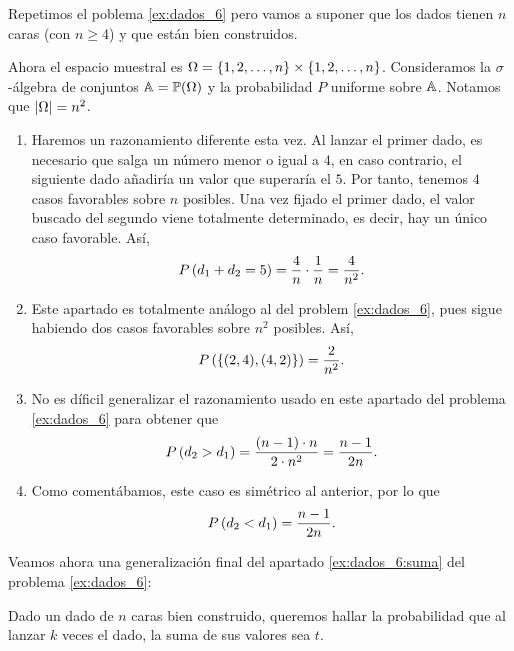 \begin{exercise} \label{ex:dados_n} Repetimos el poblema \ref{ex:dados_6}
  pero vamos a suponer que los dados tienen $n$ caras (con $n \ge 4$) y que
  están bien construidos.
\end{exercise}

\begin{solution}
  Ahora el espacio muestral es $\Omega = \left\lbrace1, 2, \dots, n\right\rbrace \times
  \left\lbrace1, 2, \dots, n\right\rbrace$. Consideramos la $\sigma$-álgebra de conjuntos
  $\mathbb{A} = \mathbb{P}(\Omega)$ y la probabilidad $P$ uniforme sobre $\mathbb{A}$.
  Notamos que $\left|\Omega\right| = n^2$.

  \begin{enumerate}
    \item Haremos un razonamiento diferente esta vez. Al lanzar el primer
    dado, es necesario que salga un número menor o igual a $4$, en caso
    contrario, el siguiente dado añadiría un valor que superaría el $5$.
    Por tanto, tenemos $4$ casos favorables sobre $n$ posibles. Una vez
    fijado el primer dado, el valor buscado del segundo viene totalmente
    determinado, es decir, hay un único caso favorable. Así,
    \[
      P\left(d_1 + d_2 = 5\right) = \frac{4}{n} \cdot \frac{1}{n} = \frac{4}{n^2}.
    \]
    \item Este apartado es totalmente análogo al del problem
    \ref{ex:dados_6}, pues sigue habiendo dos casos favorables sobre $n^2$
    posibles. Así,
    \[
      P\left(\left\lbrace(2, 4), (4, 2)\right\rbrace\right) = \frac{2}{n^2}.
    \]
    \item No es díficil generalizar el razonamiento usado en este apartado
    del problema \ref{ex:dados_6} para obtener que
    \[
      P\left(d_2 > d_1\right) =
      \frac{(n - 1) \cdot n}{2 \cdot n^2} = \frac{n - 1}{2n}.
    \]
    \item Como comentábamos, este caso es simétrico al anterior, por lo que
    \[
      P\left(d_2 < d_1\right) = \frac{n - 1}{2n}.
    \]
  \end{enumerate}
\end{solution}

Veamos ahora una generalización final del apartado \ref{ex:dados_6:suma}
del problema \ref{ex:dados_6}:

\begin{exercise*}
  Dado un dado de $n$ caras bien construido, queremos hallar la
  probabilidad que al lanzar $k$ veces el dado, la suma de sus valores sea
  $t$.
\end{exercise*}

